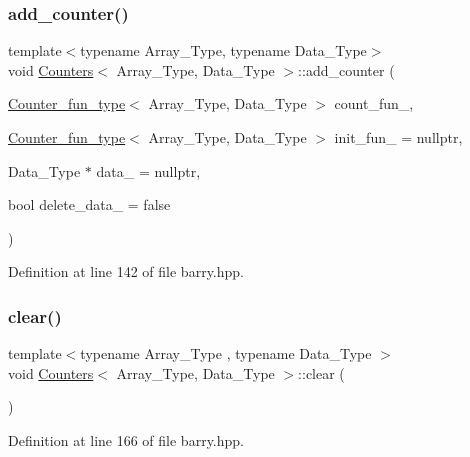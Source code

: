\subsubsection{\texorpdfstring{add\+\_\+counter()}{add\_counter()}\hspace{0.1cm}{\footnotesize\ttfamily [3/3]}}
{\footnotesize\ttfamily template$<$typename Array\+\_\+\+Type, typename Data\+\_\+\+Type$>$ \\
void \hyperlink{classbarry_1_1_counters}{Counters}$<$ Array\+\_\+\+Type, Data\+\_\+\+Type $>$\+::add\+\_\+counter (\begin{DoxyParamCaption}\item[{\hyperlink{namespacebarry_abaaae3200da8e4b7faac3c04fe9c3081}{Counter\+\_\+fun\+\_\+type}$<$ Array\+\_\+\+Type, Data\+\_\+\+Type $>$}]{count\+\_\+fun\+\_\+,  }\item[{\hyperlink{namespacebarry_abaaae3200da8e4b7faac3c04fe9c3081}{Counter\+\_\+fun\+\_\+type}$<$ Array\+\_\+\+Type, Data\+\_\+\+Type $>$}]{init\+\_\+fun\+\_\+ = {\ttfamily nullptr},  }\item[{Data\+\_\+\+Type $\ast$}]{data\+\_\+ = {\ttfamily nullptr},  }\item[{bool}]{delete\+\_\+data\+\_\+ = {\ttfamily false} }\end{DoxyParamCaption})\hspace{0.3cm}{\ttfamily [inline]}}



Definition at line 142 of file barry.\+hpp.

\mbox{\label{classbarry_1_1_counters_ae4635c154970a13ce88d2e982fe7dab3}} 
\subsubsection{\texorpdfstring{clear()}{clear()}}
{\footnotesize\ttfamily template$<$typename Array\+\_\+\+Type , typename Data\+\_\+\+Type $>$ \\
void \hyperlink{classbarry_1_1_counters}{Counters}$<$ Array\+\_\+\+Type, Data\+\_\+\+Type $>$\+::clear (\begin{DoxyParamCaption}{ }\end{DoxyParamCaption})\hspace{0.3cm}{\ttfamily [inline]}}



Definition at line 166 of file barry.\+hpp.

